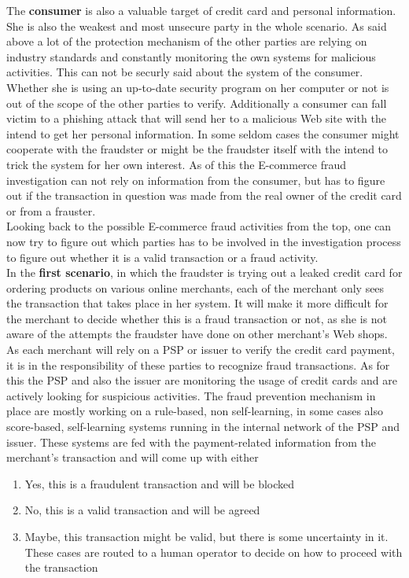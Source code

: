 The \textbf{consumer} is also a valuable target of credit card and personal information. She is also the weakest and most unsecure party in the whole scenario. As said above a lot of the protection mechanism of the other parties are relying on industry standards and constantly monitoring the own systems for malicious activities. This can not be securly said about the system of the consumer. Whether she is using an up-to-date security program on her computer or not is out of the scope of the other parties to verify. Additionally a consumer can fall victim to a phishing attack that will send her to a malicious Web site with the intend to get her personal information. In some seldom cases the consumer might cooperate with the fraudster or might be the fraudster itself with the intend to trick the system for her own interest. As of this the E-commerce fraud investigation can not rely on information from the consumer, but has to figure out if the transaction in question was made from the real owner of the credit card or from a frauster. \\

Looking back to the possible E-commerce fraud activities from the top, one can now try to figure out which parties has to be involved in the investigation process to figure out whether it is a valid transaction or a fraud activity. \\

In the \textbf{first scenario}, in which the fraudster is trying out a leaked credit card for ordering products on various online merchants, each of the merchant only sees the transaction that takes place in her system. It will make it more difficult for the merchant to decide whether this is a fraud transaction or not, as she is not aware of the attempts the fraudster have done on other merchant's Web shops. As each merchant will rely on a \gls{PSP} or issuer to verify the credit card payment, it is in the responsibility of these parties to recognize fraud transactions. As for this the \gls{PSP} and also the issuer are monitoring the usage of credit cards and are actively looking for suspicious activities. The fraud prevention mechanism in place are mostly working on a rule-based, non self-learning, in some cases also score-based, self-learning systems running in the internal network of the \gls{PSP} and issuer. These systems are fed with the payment-related information from the merchant's transaction and will come up with either\@

\begin{enumerate}
  \item Yes, this is a fraudulent transaction and will be blocked
  \item No, this is a valid transaction and will be agreed
  \item Maybe, this transaction might be valid, but there is some uncertainty in it. These cases are routed to a human operator to decide on how to proceed with the transaction
\end{enumerate}

